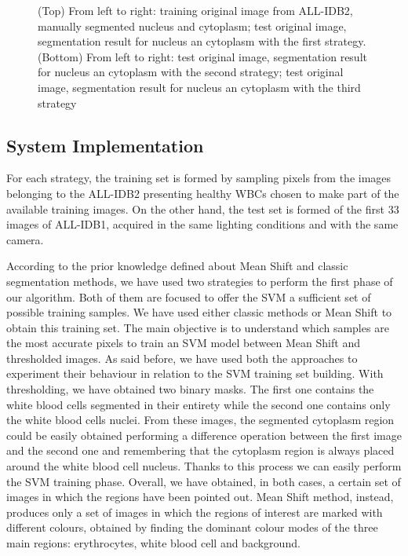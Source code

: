 \documentclass[final,a4paper,12pt,english]{UnicaPhdThesis3}
\begin{document}
\begin{figure}[!b]
		\caption{\label{fig:exs} (Top) From left to right: training original image from ALL-IDB2, manually segmented nucleus and cytoplasm; test original image, segmentation result for nucleus an cytoplasm with the first strategy. (Bottom) From left to right: test original image, segmentation result for nucleus an cytoplasm with the second strategy; test original image, segmentation result for nucleus an cytoplasm with the third strategy}
	\end{figure}
	
	\subsection{System Implementation}
	For each strategy, the training set is formed by sampling pixels from the images belonging to the ALL-IDB2 presenting healthy WBCs chosen to make part of the available training images. On the other hand, the test set is formed of the first 33 images of ALL-IDB1, acquired in the same lighting conditions and with the same camera. 
	
	According to the prior knowledge defined about Mean Shift and classic segmentation methods, we have used two strategies to perform the first phase of our algorithm. Both of them are focused to offer the SVM a sufficient set of possible training samples. We have used either classic methods or Mean Shift to obtain this training set. The main objective is to understand which samples are the most accurate pixels to train an SVM model between Mean Shift and thresholded images. As said before, we have used both the approaches to experiment their behaviour in relation to the SVM training set building. With thresholding, we have obtained two binary masks. The first one contains the white blood cells segmented in their entirety while the second one contains only the white blood cells nuclei.
	From these images, the segmented cytoplasm region could be easily obtained performing a difference operation between the first image and the second one and remembering that the cytoplasm region is always placed around the white blood cell nucleus. Thanks to this process we can easily perform the SVM training phase. Overall, we have obtained, in both cases, a certain set of images in which the regions have been pointed out. Mean Shift method, instead, produces only a set of images in which the regions of interest are marked with different colours, obtained by finding the dominant colour modes of the three main regions: erythrocytes, white blood cell and background. 
	
\end{document}
